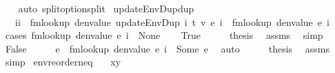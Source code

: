 \begin{isabellebody}
%
\isadelimproof
\ \ %
\endisadelimproof
%
\isatagproof
{}\isamarkupfalse%
\ {\isacharparenleft}{\kern0pt}auto\ split{\isacharcolon}{\kern0pt}option{\isachardot}{\kern0pt}split{\isacharparenright}{\kern0pt}%
\endisatagproof
{\isafoldproof}%
%
\isadelimproof
\isanewline
%
\endisadelimproof
\isanewline
\isanewline
{}\isamarkupfalse%
\ updateEnvDup{\isacharunderscore}{\kern0pt}dup{\isacharcolon}{\kern0pt}\isanewline
\ \ \ {\isachardoublequoteopen}i{\isasymnoteq}i{\isacharprime}{\kern0pt}{\isachardoublequoteclose}\ \ {\isachardoublequoteopen}fmlookup\ {\isacharparenleft}{\kern0pt}denvalue\ {\isacharparenleft}{\kern0pt}updateEnvDup\ i\ t\ v\ e{\isacharparenright}{\kern0pt}{\isacharparenright}{\kern0pt}\ i{\isacharprime}{\kern0pt}\ {\isacharequal}{\kern0pt}\ fmlookup\ {\isacharparenleft}{\kern0pt}denvalue\ e{\isacharparenright}{\kern0pt}\ i{\isacharprime}{\kern0pt}{\isachardoublequoteclose}\isanewline
%
\isadelimproof
%
\endisadelimproof
%
\isatagproof
{}\isamarkupfalse%
\ {\isacharparenleft}{\kern0pt}cases\ {\isachardoublequoteopen}fmlookup\ {\isacharparenleft}{\kern0pt}denvalue\ e{\isacharparenright}{\kern0pt}\ i\ {\isacharequal}{\kern0pt}\ None{\isachardoublequoteclose}{\isacharparenright}{\kern0pt}\isanewline
\ \ \isamarkupfalse%
\ True\isanewline
\ \ \isamarkupfalse%
\ \isamarkupfalse%
\ {\isacharquery}{\kern0pt}thesis\ \isamarkupfalse%
\ assms\ \isamarkupfalse%
\ simp\isanewline
{}\isamarkupfalse%
\isanewline
\ \ \isamarkupfalse%
\ False\isanewline
\ \ \isamarkupfalse%
\ \isamarkupfalse%
\ e{\isacharprime}{\kern0pt}\ \ {\isachardoublequoteopen}fmlookup\ {\isacharparenleft}{\kern0pt}denvalue\ e{\isacharparenright}{\kern0pt}\ i\ {\isacharequal}{\kern0pt}\ Some\ e{\isacharprime}{\kern0pt}{\isachardoublequoteclose}\ \isamarkupfalse%
\ auto\isanewline
\ \ \isamarkupfalse%
\ \isamarkupfalse%
\ {\isacharquery}{\kern0pt}thesis\ \isamarkupfalse%
\ assms\ \isamarkupfalse%
\ simp\isanewline
{}\isamarkupfalse%
%
\endisatagproof
{\isafoldproof}%
%
\isadelimproof
\isanewline
%
\endisadelimproof
\isanewline
{}\isamarkupfalse%
\ env{\isacharunderscore}{\kern0pt}reorder{\isacharunderscore}{\kern0pt}neq{\isacharcolon}{\kern0pt}\isanewline
\ \ \ {\isachardoublequoteopen}x{\isasymnoteq}y{\isachardoublequoteclose}\isanewline

\end{isabellebody}
